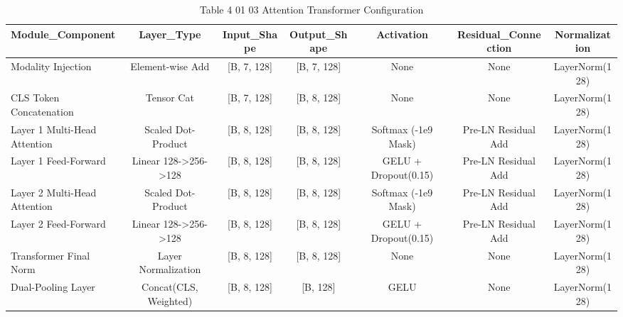 \begin{table}[htbp]
\centering
\small
\begin{tabular}{lcccccc}
\hline
Module\_Component & Layer\_Type & Input\_Shape & Output\_Shape & Activation & Residual\_Connection & Normalization \\
\hline
Modality Injection & Element-wise Add & [B, 7, 128] & [B, 7, 128] & None & None & LayerNorm(128) \\
CLS Token Concatenation & Tensor Cat & [B, 7, 128] & [B, 8, 128] & None & None & LayerNorm(128) \\
Layer 1 Multi-Head Attention & Scaled Dot-Product & [B, 8, 128] & [B, 8, 128] & Softmax (-1e9 Mask) & Pre-LN Residual Add & LayerNorm(128) \\
Layer 1 Feed-Forward & Linear 128->256->128 & [B, 8, 128] & [B, 8, 128] & GELU + Dropout(0.15) & Pre-LN Residual Add & LayerNorm(128) \\
Layer 2 Multi-Head Attention & Scaled Dot-Product & [B, 8, 128] & [B, 8, 128] & Softmax (-1e9 Mask) & Pre-LN Residual Add & LayerNorm(128) \\
Layer 2 Feed-Forward & Linear 128->256->128 & [B, 8, 128] & [B, 8, 128] & GELU + Dropout(0.15) & Pre-LN Residual Add & LayerNorm(128) \\
Transformer Final Norm & Layer Normalization & [B, 8, 128] & [B, 8, 128] & None & None & LayerNorm(128) \\
Dual-Pooling Layer & Concat(CLS, Weighted) & [B, 8, 128] & [B, 128] & GELU & None & LayerNorm(128) \\
\hline
\end{tabular}
\caption{Table 4 01 03 Attention Transformer Configuration}
\label{tab:table_4_01_03_attention_transformer_configuration}
\end{table}
